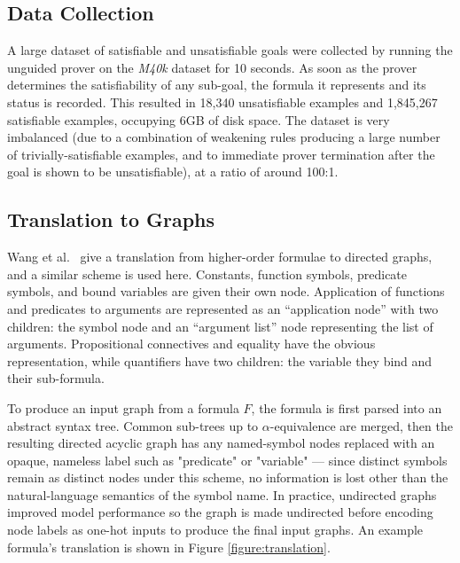 \documentclass[runningheads]{llncs}
\newcommand{\mizarlarge}{\textit{M40k}}
\begin{document}
\subsection{Data Collection}
A large dataset of satisfiable and unsatisfiable goals were collected by running the unguided prover on the \mizarlarge{} dataset for 10 seconds.
As soon as the prover determines the satisfiability of any sub-goal, the formula it represents and its status is recorded.
This resulted in 18,340 unsatisfiable examples and 1,845,267 satisfiable examples, occupying 6GB of disk space.
The dataset is very imbalanced (due to a combination of weakening rules producing a large number of trivially-satisfiable examples, and to immediate prover termination after the goal is shown to be unsatisfiable), at a ratio of around 100:1.

\subsection{Translation to Graphs}
Wang et al.~\cite{formula-graph} give a translation from higher-order formulae to directed graphs, and a similar scheme is used here.
Constants, function symbols, predicate symbols, and bound variables are given their own node.
Application of functions and predicates to arguments are represented as an ``application node'' with two children: the symbol node and an ``argument list'' node representing the list of arguments.
Propositional connectives and equality have the obvious representation, while quantifiers have two children: the variable they bind and their sub-formula.

To produce an input graph from a formula \(F\), the formula is first parsed into an abstract syntax tree.
Common sub-trees up to \(\alpha\)-equivalence are merged, then the resulting directed acyclic graph has any named-symbol nodes replaced with an opaque, nameless label such as "predicate" or "variable" --- since distinct symbols remain as distinct nodes under this scheme, no information is lost other than the natural-language semantics of the symbol name.
In practice, undirected graphs improved model performance so the graph is made undirected before encoding node labels as one-hot inputs to produce the final input graphs.
An example formula's translation is shown in Figure \ref{figure:translation}.
\end{document}
